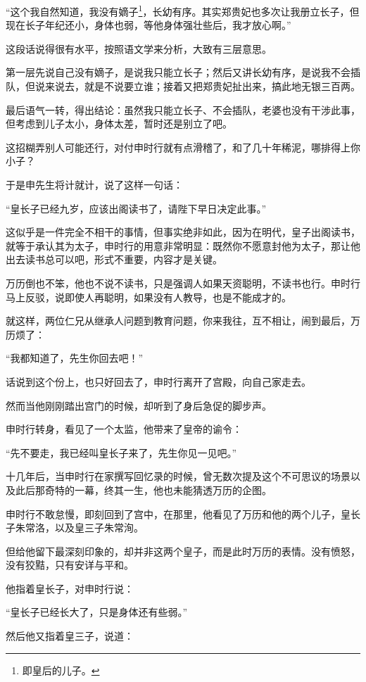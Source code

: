 \begin{multicols}{\theparacolNo}
		“这个我自然知道，我没有嫡子\footnote{即皇后的儿子。}，长幼有序。其实郑贵妃也多次让我册立长子，但现在长子年纪还小，身体也弱，等他身体强壮些后，我才放心啊。”

		这段话说得很有水平，按照语文学来分析，大致有三层意思。

		第一层先说自己没有嫡子，是说我只能立长子；然后又讲长幼有序，是说我不会插队，但说来说去，就是不说要立谁；接着又把郑贵妃扯出来，搞此地无银三百两。

		最后语气一转，得出结论：虽然我只能立长子、不会插队，老婆也没有干涉此事，但考虑到儿子太小，身体太差，暂时还是别立了吧。

		这招糊弄别人可能还行，对付申时行就有点滑稽了，和了几十年稀泥，哪排得上你小子？

		于是申先生将计就计，说了这样一句话：

		“皇长子已经九岁，应该出阁读书了，请陛下早日决定此事。”

		这似乎是一件完全不相干的事情，但事实绝非如此，因为在明代，皇子出阁读书，就等于承认其为太子，申时行的用意非常明显：既然你不愿意封他为太子，那让他出去读书总可以吧，形式不重要，内容才是关键。

		万历倒也不笨，他也不说不读书，只是强调人如果天资聪明，不读书也行。申时行马上反驳，说即使人再聪明，如果没有人教导，也是不能成才的。

		就这样，两位仁兄从继承人问题到教育问题，你来我往，互不相让，闹到最后，万历烦了：

		“我都知道了，先生你回去吧！”

		话说到这个份上，也只好回去了，申时行离开了宫殿，向自己家走去。

		然而当他刚刚踏出宫门的时候，却听到了身后急促的脚步声。

		申时行转身，看见了一个太监，他带来了皇帝的谕令：

		“先不要走，我已经叫皇长子来了，先生你见一见吧。”

		十几年后，当申时行在家撰写回忆录的时候，曾无数次提及这个不可思议的场景以及此后那奇特的一幕，终其一生，他也未能猜透万历的企图。

		申时行不敢怠慢，即刻回到了宫中，在那里，他看见了万历和他的两个儿子，皇长子朱常洛，以及皇三子朱常洵。

		但给他留下最深刻印象的，却并非这两个皇子，而是此时万历的表情。没有愤怒，没有狡黠，只有安详与平和。

		他指着皇长子，对申时行说：

		“皇长子已经长大了，只是身体还有些弱。”

		然后他又指着皇三子，说道：


\end{multicols}
